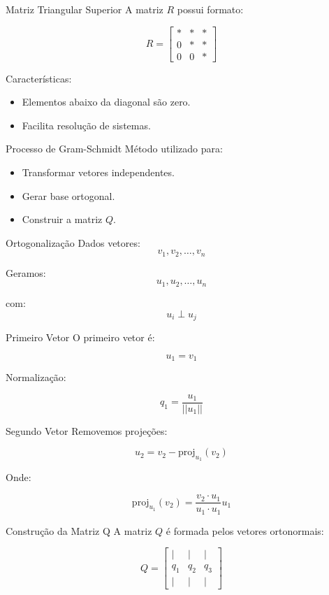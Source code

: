 \documentclass{beamer}
\begin{document}
\begin{frame}{Matriz Triangular Superior}
A matriz $R$ possui formato:

\[
R =
\begin{bmatrix}
* & * & * \\
0 & * & * \\
0 & 0 & *
\end{bmatrix}
\]

Características:
\begin{itemize}
    \item Elementos abaixo da diagonal são zero.
    \item Facilita resolução de sistemas.
\end{itemize}
\end{frame}

\begin{frame}{Processo de Gram-Schmidt}
Método utilizado para:
\begin{itemize}
    \item Transformar vetores independentes.
    \item Gerar base ortogonal.
    \item Construir a matriz $Q$.
\end{itemize}
\end{frame}

\begin{frame}{Ortogonalização}
Dados vetores:
\[
v_1, v_2, \dots, v_n
\]

Geramos:
\[
u_1, u_2, \dots, u_n
\]

com:
\[
u_i \perp u_j
\]
\end{frame}

\begin{frame}{Primeiro Vetor}
O primeiro vetor é:

\[
u_1 = v_1
\]

Normalização:

\[
q_1 = \frac{u_1}{||u_1||}
\]
\end{frame}

\begin{frame}{Segundo Vetor}
Removemos projeções:

\[
u_2 = v_2 - \text{proj}_{u_1}(v_2)
\]

Onde:

\[
\text{proj}_{u_1}(v_2) =
\frac{v_2 \cdot u_1}{u_1 \cdot u_1}u_1
\]
\end{frame}

\begin{frame}{Construção da Matriz Q}
A matriz $Q$ é formada pelos vetores ortonormais:

\[
Q =
\begin{bmatrix}
| & | & | \\
q_1 & q_2 & q_3 \\
| & | & |
\end{bmatrix}
\]
\end{frame}
\end{document}
